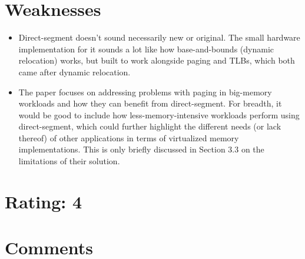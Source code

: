 \documentclass [12pt]{article}
\begin{document}
    \section{Weaknesses} %
    \label{sec:weaknesses}
        \begin{itemize}
            \item Direct-segment doesn't sound necessarily new or original. The small hardware implementation for it sounds a lot like how base-and-bounds (dynamic relocation) works, but built to work alongside paging and TLBs, which both came after dynamic relocation. 
            \item The paper focuses on addressing problems with paging in big-memory workloads and how they can benefit from direct-segment. For breadth, it would be good to include how less-memory-intensive workloads perform using direct-segment, which could further highlight the different needs (or lack thereof) of other applications in terms of virtualized memory implementations. This is only briefly discussed in Section 3.3 on the limitations of their solution.
        \end{itemize}

    \section{Rating: 4} %
    \label{sec:rating}

    \section{Comments} %
    \label{sec:comments}
\end{document}
